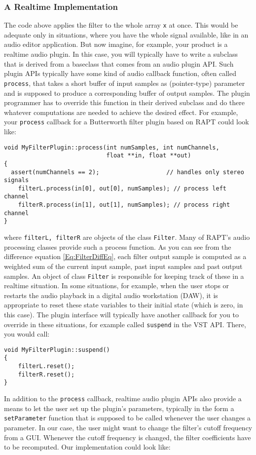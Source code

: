 \subsubsection{A Realtime Implementation}
The code above applies the filter to the whole array \texttt{x} at once. This would be adequate only in situations, where you have the whole signal available, like in an audio editor application. But now imagine, for example, your product is a realtime audio plugin. In this case, you will typically have to write a subclass that is derived from a baseclass that comes from an audio plugin API. Such plugin APIs typically have some kind of audio callback function, often called \texttt{process}, that takes a short buffer of input samples as (pointer-type) parameter and is supposed to produce a corresponding buffer of output samples. The plugin programmer has to override this function in their derived subclass and do there whatever computations are needed to achieve the desired effect. For example, your \texttt{process} callback for a Butterworth filter plugin based on RAPT could look like:
\begin{lstlisting}
void MyFilterPlugin::process(int numSamples, int numChannels, 
                             float **in, float **out)
{
  assert(numChannels == 2);                   // handles only stereo signals
	filterL.process(in[0], out[0], numSamples); // process left channel
	filterR.process(in[1], out[1], numSamples); // process right channel
}
\end{lstlisting}
where \texttt{filterL, filterR} are objects of the class \texttt{Filter}. Many of RAPT's audio processing classes provide such a process function. As you can see from the difference equation \ref{Eq:FilterDiffEq}, each filter output sample is computed as a weighted sum of the current input sample, past input samples and past output samples. An object of class \texttt{Filter} is responsible for keeping track of these in a realtime situation. In some situations, for example, when the user stops or restarts the audio playback in a digital audio workstation (DAW), it is appropriate to reset these state variables to their initial state (which is zero, in this case). The plugin interface will typically have another callback for you to override in these situations, for example called \texttt{suspend} in the VST API. There, you would call:
\begin{lstlisting}
void MyFilterPlugin::suspend()
{
	filterL.reset();
	filterR.reset();
}
\end{lstlisting}
In addition to the \texttt{process} callback, realtime audio plugin APIs also provide a means to let the user set up the plugin's parameters, typically in the form a \texttt{setParameter} function that is supposed to be called whenever the user changes a parameter. In our case, the user might want to change the filter's cutoff frequency from a GUI. Whenever the cutoff frequency is changed, the filter coefficients have to be recomputed. Our implementation could look like:
